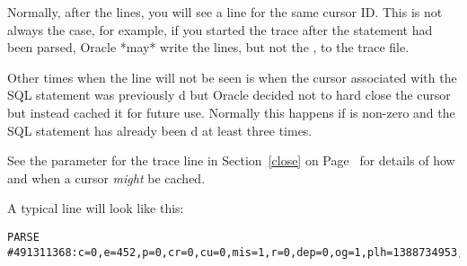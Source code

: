Normally, after the  lines, you will see a  line for the same cursor ID. This is not always the case, for example, if you started the trace after the statement had been parsed, Oracle *may* write the  lines, but not the , to the trace file.

Other times when the  line will not be seen is when the cursor associated with the SQL statement was previously d but Oracle decided not to hard close the cursor but instead cached it for future use. Normally this happens if  is non-zero and the SQL statement has already been d at least three times.

See the  parameter for the  trace line in Section~\ref{close} on Page~\pageref{close} for details of how and when a cursor \emph{might} be cached.

A typical  line will look like this:

\begin{lstlisting}[numbers=none,caption={Parse Line}]
PARSE #491311368:c=0,e=452,p=0,cr=0,cu=0,mis=1,r=0,dep=0,og=1,plh=1388734953,tim=97734887542
\end{lstlisting}

